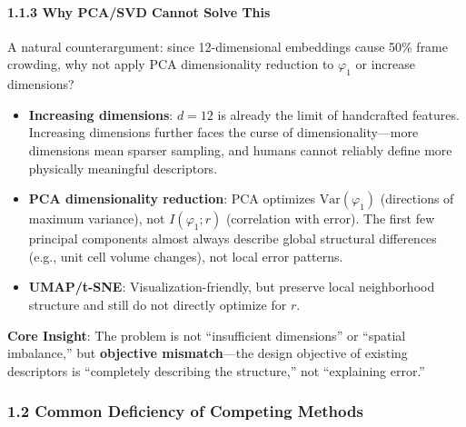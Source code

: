 \documentclass[
  12pt,
]{article}
\providecommand{\tightlist}{%
  \setlength{\itemsep}{0pt}\setlength{\parskip}{0pt}}
\begin{document}
\paragraph{1.1.3 Why PCA/SVD Cannot Solve This}\label{why-pca-svd-cannot-solve-this}

A natural counterargument: since 12-dimensional embeddings cause 50\% frame crowding, why not apply PCA dimensionality reduction to $\varphi_1$ or increase dimensions?

\begin{itemize}
\tightlist
\item
  \textbf{Increasing dimensions}: $d=12$ is already the limit of handcrafted features. Increasing dimensions further faces the curse of dimensionality---more dimensions mean sparser sampling, and humans cannot reliably define more physically meaningful descriptors.
\item
  \textbf{PCA dimensionality reduction}: PCA optimizes $\text{Var}(\varphi_1)$ (directions of maximum variance), not $I(\varphi_1; r)$ (correlation with error). The first few principal components almost always describe global structural differences (e.g., unit cell volume changes), not local error patterns.
\item
  \textbf{UMAP/t-SNE}: Visualization-friendly, but preserve local neighborhood structure and still do not directly optimize for $r$.
\end{itemize}

\textbf{Core Insight}: The problem is not ``insufficient dimensions'' or ``spatial imbalance,'' but \textbf{objective mismatch}---the design objective of existing descriptors is ``completely describing the structure,'' not ``explaining error.''

\subsubsection{1.2 Common Deficiency of Competing Methods}\label{common-deficiency-of-competing-methods}
\end{document}
